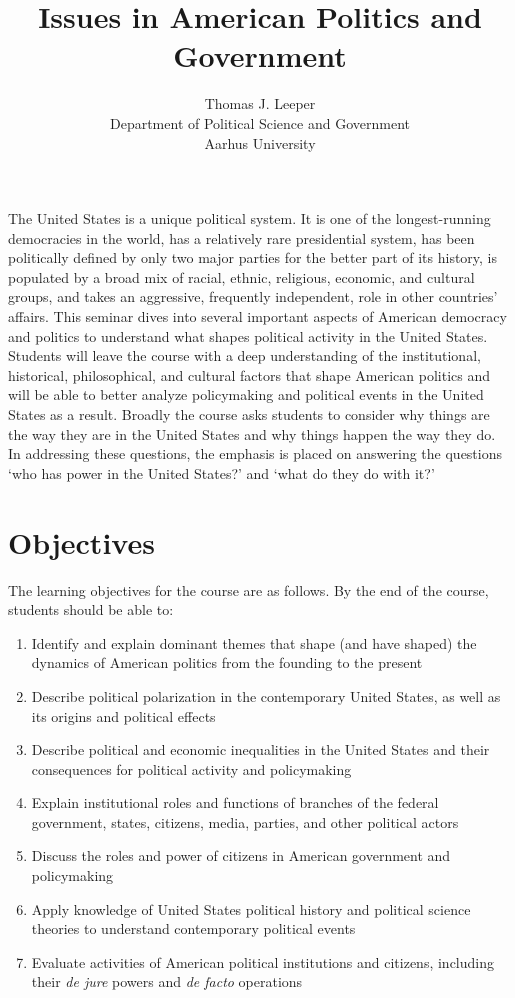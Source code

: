 \documentclass[12pt,a4paper]{article}
\title{Issues in American Politics and Government }
\author{Thomas J. Leeper\\
Department of Political Science and Government\\
Aarhus University}
\begin{document}
\nobibliography*

\maketitle

\faketableofcontents


The United States is a unique political system. It is one of the longest-running democracies in the world, has a relatively rare presidential system, has been politically defined by only two major parties for the better part of its history, is populated by a broad mix of racial, ethnic, religious, economic, and cultural groups, and takes an aggressive, frequently independent, role in other countries' affairs. This seminar dives into several important aspects of American democracy and politics to understand what shapes political activity in the United States. Students will leave the course with a deep understanding of the institutional, historical, philosophical, and cultural factors that shape American politics and will be able to better analyze policymaking and political events in the United States as a result. Broadly the course asks students to consider why things are the way they are in the United States and why things happen the way they do. In addressing these questions, the emphasis is placed on answering the questions `who has power in the United States?' and `what do they do with it?'


\section{Objectives}
The learning objectives for the course are as follows. By the end of the course, students should be able to:

\begin{enumerate}
\item Identify and explain dominant themes that shape (and have shaped) the dynamics of American politics from the founding to the present 
\item Describe political polarization in the contemporary United States, as well as its origins and political effects 
\item Describe political and economic inequalities in the United States and their consequences for political activity and policymaking 
\item Explain institutional roles and functions of branches of the federal government, states, citizens, media, parties, and other political actors 
\item Discuss the roles and power of citizens in American government and policymaking 
\item Apply knowledge of United States political history and political science theories to understand contemporary political events 
\item Evaluate activities of American political institutions and citizens, including their {\em de jure} powers and {\em de facto} operations 
\end{enumerate}
\end{document}
